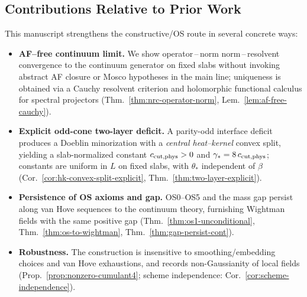 \documentclass[11pt]{amsart}
\theoremstyle{plain}
\theoremstyle{definition}
\theoremstyle{remark}
\begin{document}
\subsection*{Contributions Relative to Prior Work}
This manuscript strengthens the constructive/OS route in several concrete ways:
\begin{itemize}[leftmargin=2em, itemsep=8pt, parsep=4pt]
  \item \textbf{AF--free continuum limit.} We show operator\,–\,norm norm\,–\,resolvent convergence to the continuum generator on fixed slabs without invoking abstract AF closure or Mosco hypotheses in the main line; uniqueness is obtained via a Cauchy resolvent criterion and holomorphic functional calculus for spectral projectors (Thm.~\ref{thm:nrc-operator-norm}, Lem.~\ref{lem:af-free-cauchy}).
  \item \textbf{Explicit odd-cone two-layer deficit.} A parity-odd interface deficit produces a Doeblin minorization with a \emph{central heat--kernel} convex split, yielding a slab-normalized constant $c_{\rm cut,phys}>0$ and $\gamma_*=8\,c_{\rm cut,phys}$; constants are uniform in $L$ on fixed slabs, with $\theta_*$ independent of $\beta$ (Cor.~\ref{cor:hk-convex-split-explicit}, Thm.~\ref{thm:two-layer-explicit}).
  \item \textbf{Persistence of OS axioms and gap.} OS0--OS5 and the mass gap persist along van Hove sequences to the continuum theory, furnishing Wightman fields with the same positive gap (Thm.~\ref{thm:os1-unconditional}, Thm.~\ref{thm:os-to-wightman}, Thm.~\ref{thm:gap-persist-cont}).
  \item \textbf{Robustness.} The construction is insensitive to smoothing/embedding choices and van Hove exhaustions, and records non-Gaussianity of local fields (Prop.~\ref{prop:nonzero-cumulant4}; scheme independence: Cor.~\ref{cor:scheme-independence}).
\end{itemize}
\medskip
\end{document}
